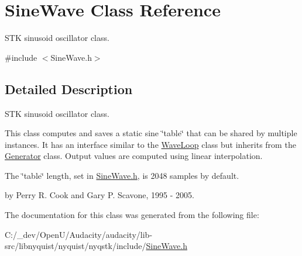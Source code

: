 \hypertarget{class_sine_wave}{}\section{Sine\+Wave Class Reference}
\label{class_sine_wave}


S\+TK sinusoid oscillator class.  




{\ttfamily \#include $<$Sine\+Wave.\+h$>$}



\subsection{Detailed Description}
S\+TK sinusoid oscillator class. 

This class computes and saves a static sine \char`\"{}table\char`\"{} that can be shared by multiple instances. It has an interface similar to the \hyperlink{class_wave_loop}{Wave\+Loop} class but inherits from the \hyperlink{class_generator}{Generator} class. Output values are computed using linear interpolation.

The \char`\"{}table\char`\"{} length, set in \hyperlink{_sine_wave_8h}{Sine\+Wave.\+h}, is 2048 samples by default.

by Perry R. Cook and Gary P. Scavone, 1995 -\/ 2005. 

The documentation for this class was generated from the following file\+:\begin{DoxyCompactItemize}
\item 
C\+:/\+\_\+dev/\+Open\+U/\+Audacity/audacity/lib-\/src/libnyquist/nyquist/nyqstk/include/\hyperlink{_sine_wave_8h}{Sine\+Wave.\+h}\end{DoxyCompactItemize}

